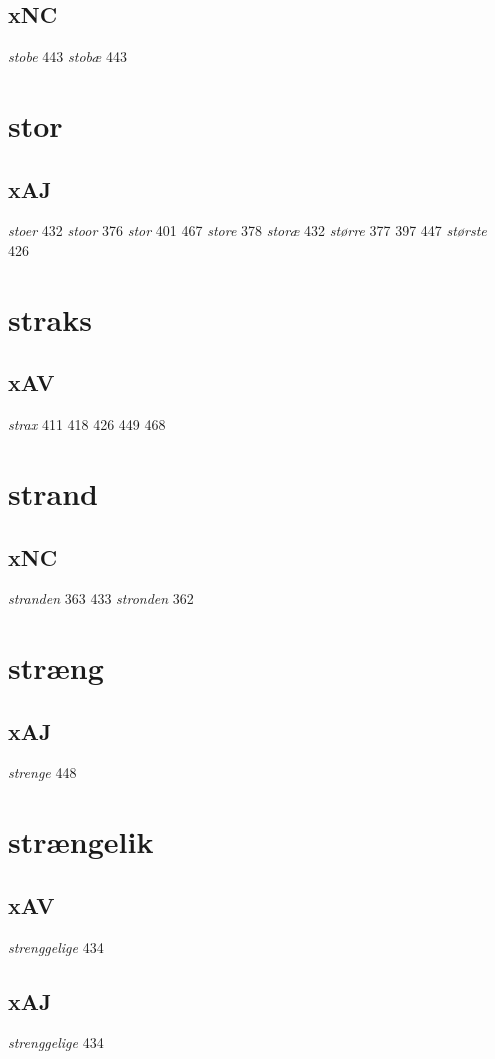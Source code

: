 \documentclass[a4paper,twocolumn]{article}
\begin{document}
\subsection{xNC}
\label{sec:orgc45ca61}
\emph{stobe} 443 \emph{stobæ} 443 
\section{stor}
\label{sec:orgb643fab}
\subsection{xAJ}
\label{sec:org0e6f914}
\emph{stoer} 432 \emph{stoor} 376 \emph{stor} 401 467 \emph{store} 378 \emph{storæ} 432 \emph{større} 377 397 447 \emph{største} 426 
\section{straks}
\label{sec:org2c068fc}
\subsection{xAV}
\label{sec:org581e436}
\emph{strax} 411 418 426 449 468 
\section{strand}
\label{sec:orgf084ef6}
\subsection{xNC}
\label{sec:orgad54b96}
\emph{stranden} 363 433 \emph{stronden} 362 
\section{stræng}
\label{sec:org41a6704}
\subsection{xAJ}
\label{sec:orgc8b24e6}
\emph{strenge} 448 
\section{strængelik}
\label{sec:org74125c5}
\subsection{xAV}
\label{sec:orga6a22f6}
\emph{strenggelige} 434 
\subsection{xAJ}
\label{sec:orgedb46f5}
\emph{strenggelige} 434 
\end{document}
